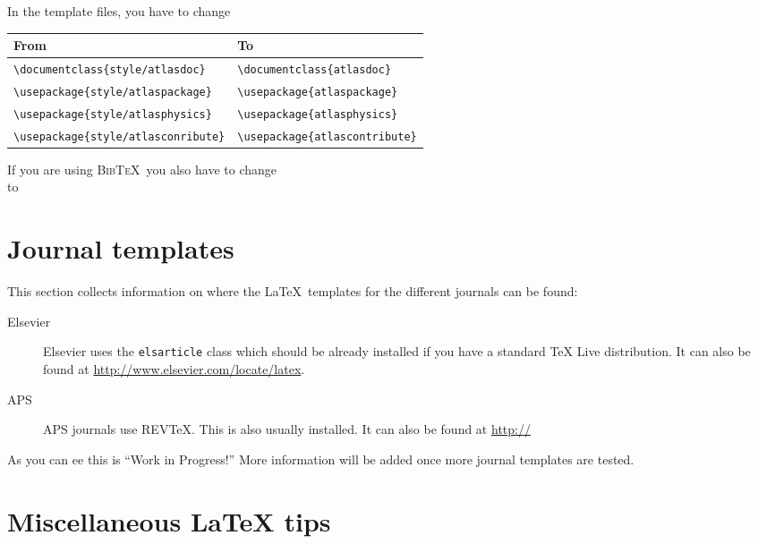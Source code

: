 \documentclass[koma,UKenglish]{style/atlasdoc}
\newcommand{\BibTeX}{\textsc{Bib\TeX}}
\begin{document}
In the template files, you have to change
\begin{center}
	\begin{tabular}{ll}
		From & To \\
		\midrule
		\verb|\documentclass{style/atlasdoc}|    & \verb|\documentclass{atlasdoc}| \\
		\verb|\usepackage{style/atlaspackage}|   & \verb|\usepackage{atlaspackage}| \\
		\verb|\usepackage{style/atlasphysics}|   & \verb|\usepackage{atlasphysics}| \\
		\verb|\usepackage{style/atlasconribute}| & \verb|\usepackage{atlascontribute}|
	\end{tabular}
\end{center}

If you are using \BibTeX\ you also have to change\\
\verb|| to\\
\verb||

\section{Journal templates}
\label{sec:journal}

This section collects information on where the \LaTeX\ templates for the different journals can be found:
\begin{description}
\item[Elsevier] Elsevier uses the \texttt{elsarticle} class which should be already installed if you have a standard 
	TeX Live distribution. 
	It can also be found at \url{http://www.elsevier.com/locate/latex}.
\item[APS] APS journals use REV\TeX. This is also usually installed.
	It can also be found at \url{http://} 
\end{description}

As you can ee this is \enquote{Work in Progress!} More information will be added once more journal templates are tested.


\section{Miscellaneous \LaTeX{} tips}
\label{sec:latex}
\end{document}
